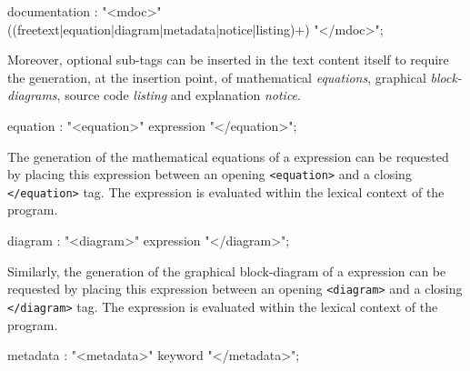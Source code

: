 \begin{rail}
documentation : "<mdoc>" ((freetext|equation|diagram|metadata|notice|listing)+) "</mdoc>";
\end{rail}


Moreover, optional sub-tags can be inserted in the text content itself to require the generation, at the insertion point, of mathematical \textit{equations}, graphical \textit{block-diagrams}, \faust source code \textit{listing} and explanation \textit{notice}.


\begin{rail}
equation : "<equation>" expression "</equation>";
\end{rail}

The generation of the mathematical equations of a \faust expression can be requested by placing this expression between an opening \lstinline'<equation>' and a closing \lstinline'</equation>' tag. The expression is evaluated within the lexical context of the \faust program.


\begin{rail}
diagram : "<diagram>" expression "</diagram>";
\end{rail}

Similarly, the generation of the graphical block-diagram of a \faust expression can be requested by placing this expression between an opening \lstinline'<diagram>' and a closing \lstinline'</diagram>' tag. The expression is evaluated within the lexical context of the \faust program.


\begin{rail}
metadata : "<metadata>" keyword "</metadata>";
\end{rail}

